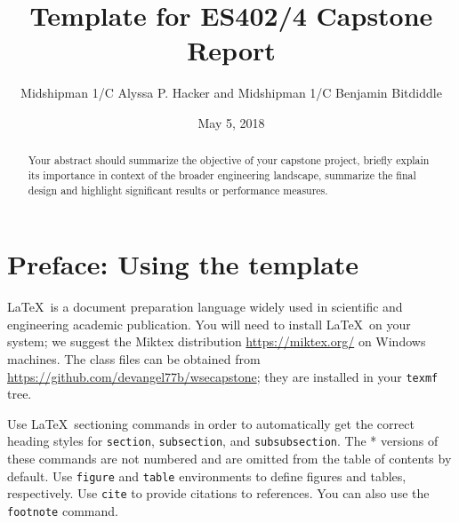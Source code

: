 \documentclass{wsecapstone}
\title{Template for ES402/4 Capstone Report}
\author{Midshipman 1/C Alyssa P. Hacker and Midshipman 1/C Benjamin Bitdiddle}
\date{May 5, 2018} %
\begin{document}
\maketitlepage
\cleardoublepage
\tableofcontents

\clearpage
\maketitle
\begin{abstract}
Your abstract should summarize the objective of your capstone project, briefly explain its importance in context of the broader engineering landscape, summarize the final design and highlight significant results or performance measures.
\end{abstract}

\section*{Preface: Using the template}
\LaTeX\ is a document preparation language widely used in scientific and engineering academic publication.  You will need to install \LaTeX\ on your system; we suggest the Miktex distribution \url{https://miktex.org/} on Windows machines. The class files can be obtained from \url{https://github.com/devangel77b/wsecapstone}; they are installed in your \lstinline{texmf} tree. 

Use \LaTeX\ sectioning commands in order to automatically get the correct heading styles for \lstinline{section}, \lstinline{subsection}, and \lstinline{subsubsection}. The * versions of these commands are not numbered and are omitted from the table of contents by default. Use \lstinline{figure} and \lstinline{table} environments to define figures and tables, respectively. Use \lstinline{cite} to provide citations to references. You can also use the \lstinline{footnote} command.  
\end{document}
